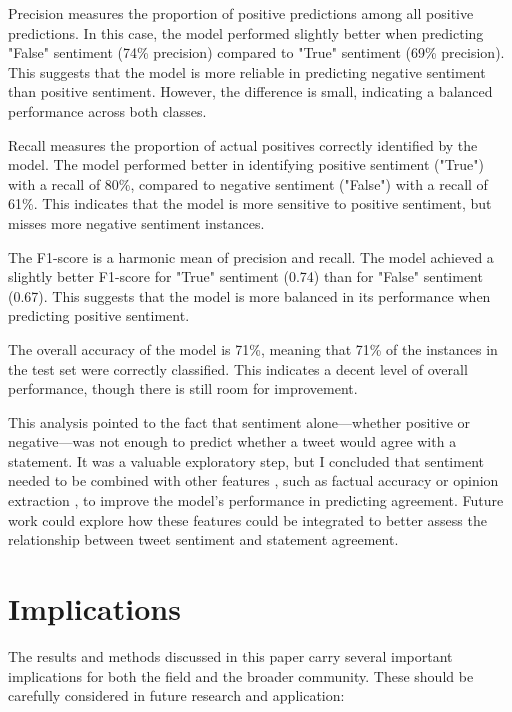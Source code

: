 \documentclass[14]{article}
\begin{document}
Precision measures the proportion of positive predictions among all positive predictions. In this case, the model performed slightly better when predicting "False" sentiment (74\% precision) compared to "True" sentiment (69\% precision). This suggests that the model is more reliable in predicting negative sentiment than positive sentiment. However, the difference is small, indicating a balanced performance across both classes.

Recall measures the proportion of actual positives correctly identified by the model. The model performed better in identifying positive sentiment ("True") with a recall of 80\%, compared to negative sentiment ("False") with a recall of 61\%. This indicates that the model is more sensitive to positive sentiment, but misses more negative sentiment instances.

The F1-score is a harmonic mean of precision and recall. The model achieved a slightly better F1-score for "True" sentiment (0.74) than for "False" sentiment (0.67). This suggests that the model is more balanced in its performance when predicting positive sentiment.

The overall accuracy of the model is 71\%, meaning that 71\% of the instances in the test set were correctly classified. This indicates a decent level of overall performance, though there is still room for improvement.

This analysis pointed to the fact that sentiment alone—whether positive or negative—was not enough to predict whether a tweet would agree with a statement. It was a valuable exploratory step, but I concluded that sentiment needed to be combined with other features \cite{twitter_sentiment_analysis}, such as factual accuracy or opinion extraction \cite{sentiment_opinion_mining}, to improve the model's performance in predicting agreement. Future work could explore how these features could be integrated to better assess the relationship between tweet sentiment and statement agreement.

\section{Implications}

The results and methods discussed in this paper carry several important implications for both the field and the broader community. These should be carefully considered in future research and application:
\end{document}
